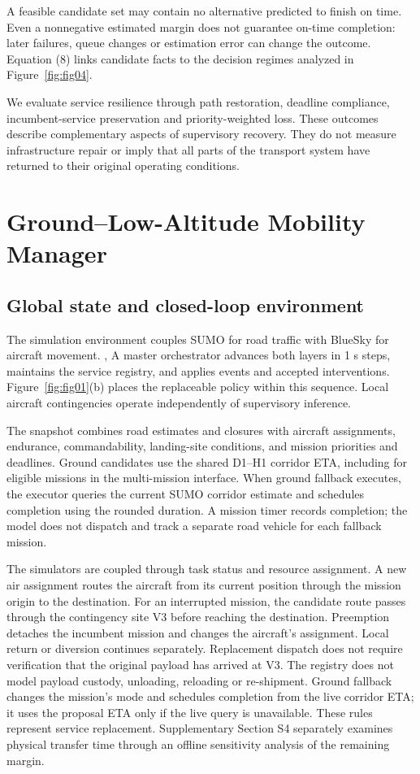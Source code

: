 \documentclass[]{interact}
\theoremstyle{plain}
\theoremstyle{definition}
\theoremstyle{remark}
\begin{document}
A feasible candidate set may contain no alternative predicted to finish on time. Even a nonnegative estimated margin does not guarantee on-time completion: later failures, queue changes or estimation error can change the outcome. Equation (8) links candidate facts to the decision regimes analyzed in Figure~\ref{fig:fig04}.

We evaluate service resilience through path restoration, deadline compliance, incumbent-service preservation and priority-weighted loss. These outcomes describe complementary aspects of supervisory recovery. They do not measure infrastructure repair or imply that all parts of the transport system have returned to their original operating conditions.

\section{Ground--Low-Altitude Mobility Manager}

\subsection{Global state and closed-loop environment}

The simulation environment couples SUMO for road traffic with BlueSky for aircraft movement. \citep{ref12}, \citep{ref13} A master orchestrator advances both layers in 1 s steps, maintains the service registry, and applies events and accepted interventions. Figure~\ref{fig:fig01}(b) places the replaceable policy within this sequence. Local aircraft contingencies operate independently of supervisory inference.

The snapshot combines road estimates and closures with aircraft assignments, endurance, commandability, landing-site conditions, and mission priorities and deadlines. Ground candidates use the shared D1--H1 corridor ETA, including for eligible missions in the multi-mission interface. When ground fallback executes, the executor queries the current SUMO corridor estimate and schedules completion using the rounded duration. A mission timer records completion; the model does not dispatch and track a separate road vehicle for each fallback mission.

The simulators are coupled through task status and resource assignment. A new air assignment routes the aircraft from its current position through the mission origin to the destination. For an interrupted mission, the candidate route passes through the contingency site V3 before reaching the destination. Preemption detaches the incumbent mission and changes the aircraft's assignment. Local return or diversion continues separately. Replacement dispatch does not require verification that the original payload has arrived at V3. The registry does not model payload custody, unloading, reloading or re-shipment. Ground fallback changes the mission's mode and schedules completion from the live corridor ETA; it uses the proposal ETA only if the live query is unavailable. These rules represent service replacement. Supplementary Section S4 separately examines physical transfer time through an offline sensitivity analysis of the remaining margin.
\end{document}

